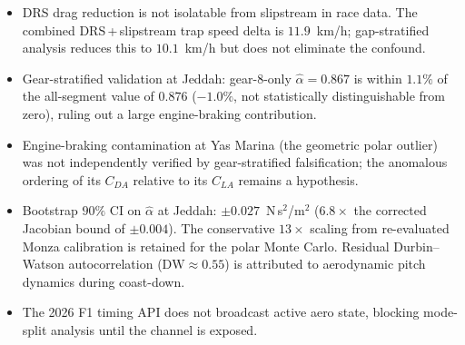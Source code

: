 \begin{itemize}
    \item DRS drag reduction is not isolatable from slipstream in race data. The combined DRS\,+\,slipstream trap speed delta is $11.9$~km/h; gap-stratified analysis reduces this to $10.1$~km/h but does not eliminate the confound.

    \item Gear-stratified validation at Jeddah: gear-8-only $\hat\alpha = 0.867$ is within $1.1\%$ of the all-segment value of $0.876$ ($-1.0\%$, not statistically distinguishable from zero), ruling out a large engine-braking contribution.

    \item Engine-braking contamination at Yas Marina (the geometric polar outlier) was not independently verified by gear-stratified falsification; the anomalous ordering of its $C_{DA}$ relative to its $C_{LA}$ remains a hypothesis.

    \item Bootstrap $90\%$ CI on $\hat\alpha$ at Jeddah: $\pm 0.027$~N\,s$^2$/m$^2$ ($6.8\times$ the corrected Jacobian bound of $\pm 0.004$). The conservative $13\times$ scaling from re-evaluated Monza calibration is retained for the polar Monte Carlo. Residual Durbin--Watson autocorrelation ($\text{DW} \approx 0.55$) is attributed to aerodynamic pitch dynamics during coast-down.

    \item The 2026 F1 timing API does not broadcast active aero state, blocking mode-split analysis until the channel is exposed.
\end{itemize}
